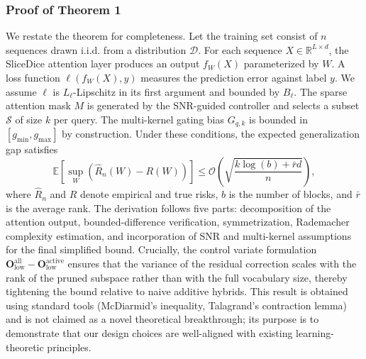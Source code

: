 \documentclass{article}
\begin{document}
\subsubsection*{Proof of Theorem 1}
We restate the theorem for completeness. Let the training set consist of \(n\) sequences drawn i.i.d. from a distribution \(\mathcal{D}\). For each sequence \(X \in \mathbb{R}^{L\times d}\), the SliceDice attention layer produces an output \(f_W(X)\) parameterized by \(W\). A loss function \(\ell(f_W(X), y)\) measures the prediction error against label \(y\). We assume \(\ell\) is \(L_\ell\)-Lipschitz in its first argument and bounded by \(B_\ell\). The sparse attention mask \(M\) is generated by the SNR-guided controller and selects a subset \(\mathcal{S}\) of size \(k\) per query. The multi-kernel gating bias \(G_{q,k}\) is bounded in \([g_{\min}, g_{\max}]\) by construction. Under these conditions, the expected generalization gap satisfies
\[
\mathbb{E}[\sup_{W} (\hat{R}_n(W) - R(W))] \le \mathcal{O}\!\left( \sqrt{\frac{k \log(b) + \bar{r} d}{n}} \right),
\]
where \(\hat{R}_n\) and \(R\) denote empirical and true risks, \(b\) is the number of blocks, and \(\bar{r}\) is the average rank. The derivation follows five parts: decomposition of the attention output, bounded-difference verification, symmetrization, Rademacher complexity estimation, and incorporation of SNR and multi-kernel assumptions for the final simplified bound. Crucially, the control variate formulation \(\mathbf{O}_{\text{low}}^{\text{all}} - \mathbf{O}_{\text{low}}^{\text{active}}\) ensures that the variance of the residual correction scales with the rank of the pruned subspace rather than with the full vocabulary size, thereby tightening the bound relative to naive additive hybrids. This result is obtained using standard tools (McDiarmid's inequality, Talagrand's contraction lemma) and is not claimed as a novel theoretical breakthrough; its purpose is to demonstrate that our design choices are well-aligned with existing learning-theoretic principles.
\end{document}
